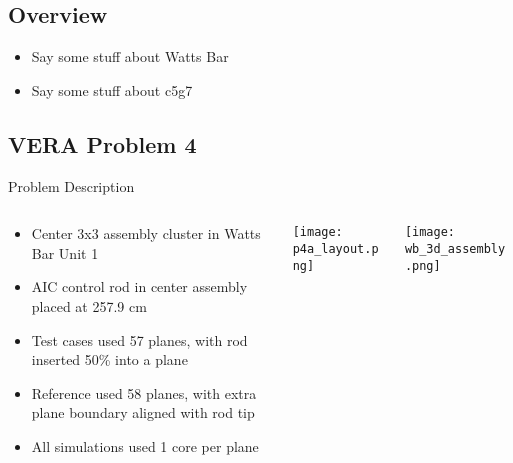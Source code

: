 \subsection{Overview}
\begin{frame}
    
    \begin{itemize}
        \item Say some stuff about Watts Bar
        \item Say some stuff about c5g7
    \end{itemize}

\end{frame}


\subsection{VERA Problem 4}
\begin{frame}[t]{Problem Description}
    
\begin{columns}
    \begin{column}{0.5\textwidth}
        \begin{itemize}
            \item Center 3x3 assembly cluster in Watts Bar Unit 1
            \item AIC control rod in center assembly placed at 257.9 cm
            \item Test cases used 57 planes, with rod inserted 50\% into a plane
            \item Reference used 58 planes, with extra plane boundary aligned 
            with rod tip
            \item All simulations used 1 core per plane
        \end{itemize}
    \end{column}
    \begin{column}{0.28\textwidth}
        \texttt{[image: p4a\_layout.png]}
    \end{column}
    \begin{column}{0.22\textwidth}
        \texttt{[image: wb\_3d\_assembly.png]}
\end{column}
\end{columns}
    
\end{frame}


